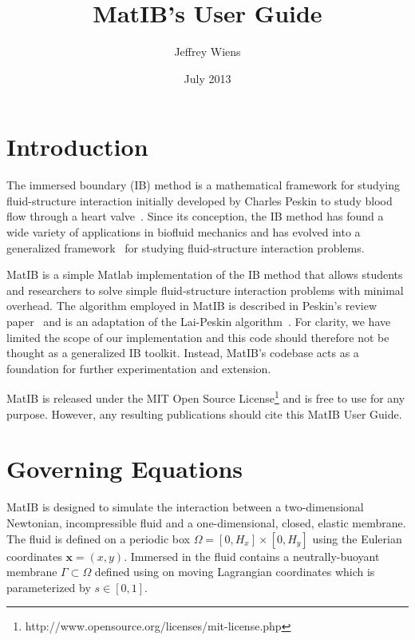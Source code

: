 \documentclass{article}
\title{MatIB's User Guide}
\author{Jeffrey Wiens}
\date{July 2013}
\newcommand{\bs}[1]{\boldsymbol{#1}}
\begin{document}
\maketitle

\section{Introduction}\label{sec:intro}

The immersed boundary (IB) method is a mathematical framework for studying fluid-structure interaction  
initially developed by Charles Peskin to study blood flow through a heart valve~\cite{PeskinHearts}. 
Since its conception, the IB method has found a wide variety of applications in biofluid mechanics and has
evolved into a generalized framework~\cite{PeskinIB} for studying fluid-structure interaction problems. 

MatIB is a simple Matlab implementation of the IB method that allows students and researchers to 
solve simple fluid-structure interaction problems with minimal overhead. 
The algorithm employed in MatIB is described in Peskin's review paper~\cite{PeskinIB} 
and is an adaptation of the Lai-Peskin algorithm~\cite{LaiAlgorithm}. For clarity, we have limited 
the scope of our implementation and this code should therefore not be thought as a generalized IB toolkit. 
Instead, MatIB's codebase acts as a foundation for further experimentation and extension.

MatIB is released under the 
MIT Open Source License\footnote{http://www.opensource.org/licenses/mit-license.php} and is free to use 
for any purpose. However, any resulting publications should cite this
MatIB User Guide.


\section{Governing Equations}\label{sec:equations}

MatIB is designed to simulate the interaction between a two-dimensional Newtonian, incompressible fluid 
and a one-dimensional, closed, elastic membrane. The fluid is defined on a periodic box $\Omega = [0,H_x] \times [0,H_y]$
using the Eulerian coordinates $\bs{x} = (x,y)$. Immersed in the fluid contains a neutrally-buoyant membrane $\Gamma \subset \Omega$
defined using on moving Lagrangian coordinates which is parameterized by $s \in [0,1]$.
\end{document}
